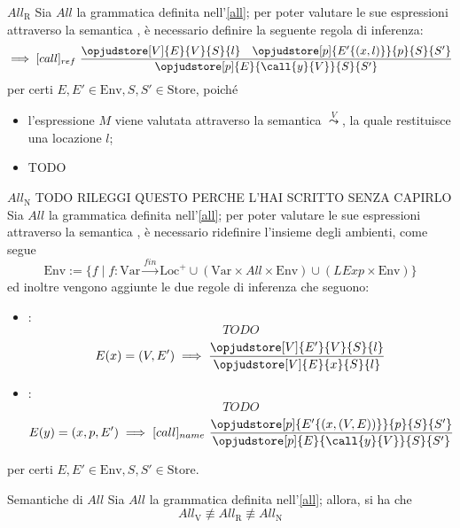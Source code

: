 \documentclass[a4paper, 12pt]{report}
\begin{document}
    \begin{framedprop}[label={all r}]{$All_\mathrm{R}$}
        Sia $All$ la grammatica definita nell'\cref{all}; per poter valutare le sue espressioni attraverso la semantica , è necessario definire la seguente regola di inferenza:  $$\implies [call]_{ref} \ \dfrac{\opjudstore[V]{E}{V}{S}{l} \quad \opjudstore[p]{E'\{(x,l)\}}{p}{S}{S'}}{\opjudstore[p]{E}{\call{y}{V}}{S}{S'}}$$ per certi $E,E' \in \mathrm{Env}, S,S' \in \mathrm{Store}$, poiché

        \begin{itemize}
            \item l'espressione $M$ viene valutata attraverso la semantica $\stackrel{V}{\leadsto}$, la quale restituisce una locazione $l$;
            \item TODO
        \end{itemize}
    \end{framedprop}

    \begin{framedprop}[label={all n}]{$All_\mathrm{N}$}
        TODO RILEGGI QUESTO PERCHE L'HAI SCRITTO SENZA CAPIRLO
        Sia $All$ la grammatica definita nell'\cref{all}; per poter valutare le sue espressioni attraverso la semantica , è necessario ridefinire l'insieme degli ambienti, come segue $$\mathrm{Env} := \{f \mid f : \mathrm{Var} \xrightarrow{fin} \mathrm{Loc}^+ \cup (\mathrm{Var} \times All \times \mathrm{Env}) \cup (LExp \times \mathrm{Env})\}$$ ed inoltre vengono aggiunte le due regole di inferenza che seguono:

        \begin{itemize}
            \item {}: $$TODO$$ $$E(x) = (V, E') \implies \dfrac{\opjudstore[V]{E'}{V}{S}{l}}{\opjudstore[V]{E}{x}{S}{l}}$$
            \item {}: $$TODO$$ $$E(y) = (x, p, E') \implies [call]_{name} \ \dfrac{\opjudstore[p]{E'\{(x,(V,E))\}}{p}{S}{S'}}{\opjudstore[p]{E}{\call{y}{V}}{S}{S'}}$$
        \end{itemize}

        per certi $E, E' \in \mathrm{Env}, S, S' \in \mathrm{Store}$.
    \end{framedprop}

    \begin{framedlem}{Semantiche di $All$}
        Sia $All$ la grammatica definita nell'\cref{all}; allora, si ha che $$All_\mathrm{V} \not\equiv All_\mathrm{R} \not\equiv All_\mathrm{N}$$
    \end{framedlem}
    
\end{document}
